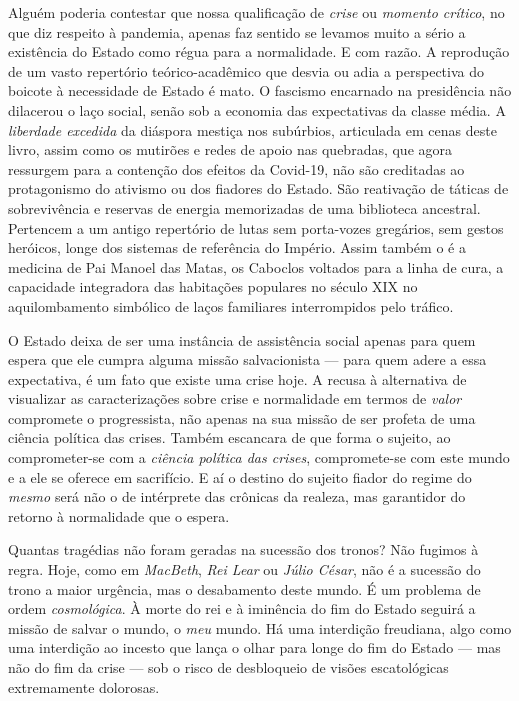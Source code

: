 Alguém poderia contestar que nossa qualificação de \emph{crise} ou
\emph{momento crítico}, no que diz respeito à pandemia, apenas faz
sentido se levamos muito a sério a existência do Estado como régua para
a normalidade. E com razão. A reprodução de um vasto repertório
teórico-acadêmico que desvia ou adia a perspectiva do boicote à
necessidade de Estado é mato. O fascismo encarnado na presidência não
dilacerou o laço social, senão sob a economia das expectativas da classe
média. A \emph{liberdade excedida} da diáspora mestiça nos subúrbios,
articulada em cenas deste livro, assim como os mutirões e redes de apoio
nas quebradas, que agora ressurgem para a contenção dos efeitos da
Covid-19, não são creditadas ao protagonismo do ativismo ou dos fiadores
do Estado. São reativação de táticas de sobrevivência e reservas de
energia memorizadas de uma biblioteca ancestral. Pertencem a um antigo
repertório de lutas sem porta-vozes gregários, sem gestos heróicos,
longe dos sistemas de referência do Império. Assim também o é a medicina
de Pai Manoel das Matas, os Caboclos voltados para a linha de cura, a
capacidade integradora das habitações populares no século XIX no
aquilombamento simbólico de laços familiares interrompidos pelo
tráfico.~

O Estado deixa de ser uma instância de assistência social apenas para
quem espera que ele cumpra alguma missão salvacionista --- para quem
adere a essa expectativa, é um fato que existe uma crise hoje. A recusa
à alternativa de visualizar as caracterizações sobre crise e normalidade
em termos de \emph{valor} compromete o progressista, não apenas na sua
missão de ser profeta de uma ciência política das crises. Também
escancara de que forma o sujeito, ao comprometer-se com a \emph{ciência
política das crises}, compromete-se com este mundo e a ele se oferece em
sacrifício. E aí o destino do sujeito fiador do regime do \emph{mesmo}
será não o de intérprete das crônicas da realeza, mas garantidor do
retorno à normalidade que o espera.~

Quantas tragédias não foram geradas na sucessão dos tronos? Não fugimos
à regra. Hoje, como em \emph{MacBeth}, \emph{Rei Lear} ou \emph{Júlio
César}, não é a sucessão do trono a maior urgência, mas o desabamento
deste mundo. É um problema de ordem \emph{cosmológica}. À morte do rei e
à iminência do fim do Estado seguirá a missão de salvar o mundo, o
\emph{meu} mundo. Há uma interdição freudiana, algo como uma interdição
ao incesto que lança o olhar para longe do fim do Estado --- mas não do
fim da crise --- sob o risco de desbloqueio de visões escatológicas
extremamente dolorosas.

